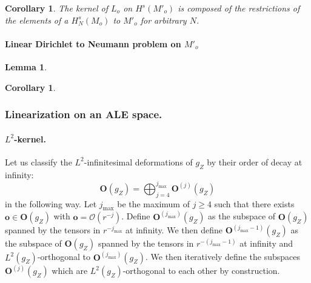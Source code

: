 \documentclass[12pt]{article}
\newtheorem{lem}[thm]{Lemma}
\newtheorem{cor}[thm]{Corollary}
\begin{document}
\begin{cor}
    The kernel of $L_o$ on $H^s(M'_o)$ is composed of the restrictions of the elements of a $H^s_N(M_o)$ to $M'_o$ for arbitrary $N$.
\end{cor} 

\paragraph{Linear Dirichlet to Neumann problem on $M'_o$}

\begin{lem}
    
\end{lem}

\begin{cor}
\end{cor}


\subsubsection{Linearization on an ALE space.}


\paragraph{$L^2$-kernel.}

Let us classify the $L^2$-infinitesimal deformations of ${g_Z}$ by their order of decay at infinity:
   $$ \mathbf{O}({g_Z}) = \bigoplus_{j = 4}^{j_{\max}} \mathbf{O}^{(j)}({g_Z}) $$
   in the following way. Let $j_{\max}$ be the maximum of $j\geqslant 4$ such that there exists $\mathbf{o}\in \mathbf{O}({g_Z})$ with $ \mathbf{o} = \mathcal{O}(r^{-j}) $. Define $\mathbf{O}^{(j_{\max})}({g_Z})$ as the subspace of $\mathbf{O}({g_Z})$ spanned by the tensors in $r^{-j_{\max}}$ at infinity. We then define $\mathbf{O}^{(j_{\max}-1)}({g_Z})$ as the subspace of $\mathbf{O}({g_Z})$ spanned by the tensors in $r^{-(j_{\max}- 1)}$ at infinity and $L^2({g_Z})$-orthogonal to $\mathbf{O}^{(j_{\max})}({g_Z})$. We then iteratively define the subspaces $\mathbf{O}^{(j)}({g_Z})$ which are $L^2({g_Z})$-orthogonal to each other by construction.
   
\end{document}
